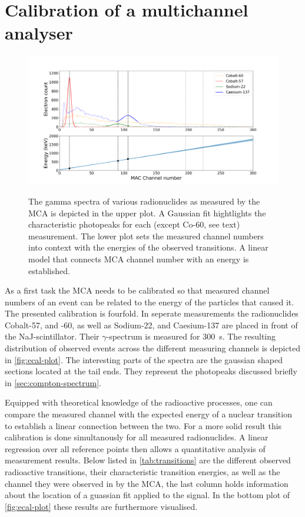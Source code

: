 
\section{Calibration of a multichannel analyser}
\label{sec:ecal}

\begin{figure}
	\includegraphics[width=1.0\textwidth]{./fig/ecal-plot.png}
	\caption{}{The gamma spectra of various radionuclides as measured by the MCA
	is depicted in the upper plot. A Gaussian fit hightlights the characteristic
	photopeaks for each (except Co-60, see text) measurement. The lower plot
	sets the measured channel numbers into context with the energies of the
	observed transitions. A linear model that connects MCA channel number with an
	energy is established.}\label{fig:ecal-plot}
\end{figure}

As a first task the MCA needs to be calibrated so that measured channel numbers of an
event can be related to the energy of the particles that caused it. The presented
calibration is fourfold. In seperate measurements the radionuclides Cobalt-57, and
-60, as well as Sodium-22, and Caesium-137 are placed in front of the
NaJ-scintillator. Their $\gamma$-spectrum is measured for \SI{300}{\second}. The
resulting distribution of observed events across the different measuring channels is
depicted in \autoref{fig:ecal-plot}. The interesting parts of the spectra are the
gaussian shaped sections located at the tail ends. They represent the photopeaks
discussed briefly in \autoref{sec:compton-spectrum}.

Equipped with theoretical knowledge of the radioactive processes, one can compare the
measured channel with the expected energy of a nuclear transition to establish a
linear connection between the two. For a more solid result this calibration is done
simultanously for all measured radionuclides. A linear regression over all reference
points then allows a quantitative analysis of measurement results. Below listed in
\autoref{tab:transitions} are the different observed radioactive transitions, their
characteristic transition energies, as well as the channel they were observed in by
the MCA, the last column holds information about the location of a guassian fit
applied to the signal. In the bottom plot of \autoref{fig:ecal-plot} these results
are furthermore visualised.

